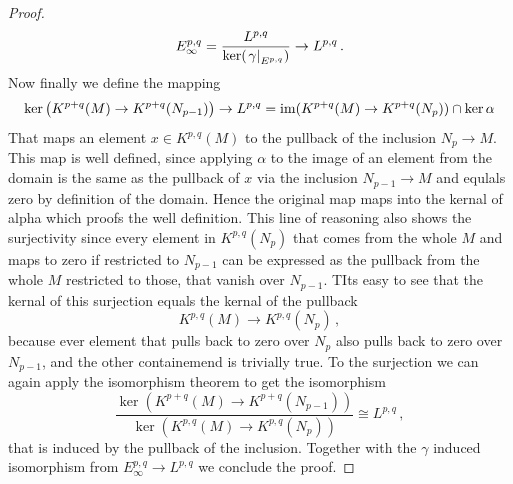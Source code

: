 \begin{proof}
	\begin{equation*}
		E^{p,q}_\infty=\frac{L^{p,q}}{\ker(\left.\gamma\right|_{E^{p,q}})} \to L^{p,q}\,.
	\end{equation*}
	Now finally we define the mapping
	\begin{equation*}
		\ker \left(K^{p+q}(M)\to K^{p+q}(N_{p-1})\right) \to L^{p,q}
		=\mathrm{im}(K^{p+q}(M)\to K^{p+q}(N_p)) \cap \ker \alpha\\
	\end{equation*} That maps an element $x\in K^{p,q}(M)$ to the pullback of the inclusion $N_p\to M$. This map is well defined, since applying $\alpha$ to the image of an element from the domain is the same as the pullback of $x$ via the inclusion $N_{p-1}\to M$ and equlals zero by definition of the domain. Hence the original map maps into the kernal of alpha which proofs the well definition. This line of reasoning also shows the surjectivity since every element in $K^{p,q}(N_p)$ that comes from the whole $M$ and maps to zero if restricted to $N_{p-1}$ can be expressed as the pullback from the whole $M$ restricted to those, that vanish over $N_{p-1}$. TIts easy to see that the kernal of this surjection equals the kernal of the pullback
	\begin{equation*}
		K^{p,q}(M)\to K^{p,q}(N_p)\,,
	\end{equation*} because ever element that pulls back to zero over $N_p$ also pulls back to zero over $N_{p-1}$, and the other containemend is trivially true.
	To the surjection we can again apply the isomorphism theorem to get the isomorphism
	\begin{equation*}
		\frac{\ker \left(K^{p+q}(M)\to K^{p+q}(N_{p-1})\right) }{\ker\left( K^{p,q}(M)\to K^{p,q}(N_p)\right)} \cong L^{p,q}\,,
	\end{equation*} that is induced by the pullback of the inclusion. Together with the $\gamma$ induced isomorphism from $E_\infty^{p,q}\to L^{p,q}$ we conclude the proof.
\end{proof}
